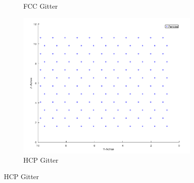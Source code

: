 \documentclass[12pt,a4paper,ngerman]{article}
\begin{document}
\begin{figure}
\begin{subfigure}[b]{0.3\textwidth}
		\caption{FCC Gitter}
	\end{subfigure}
	\begin{subfigure}[b]{0.3\textwidth}
		\includegraphics[width=\textwidth]{data/HCP_perfect.png}
		\caption{HCP Gitter}
	\end{subfigure}
	

\end{figure}
\end{document}
